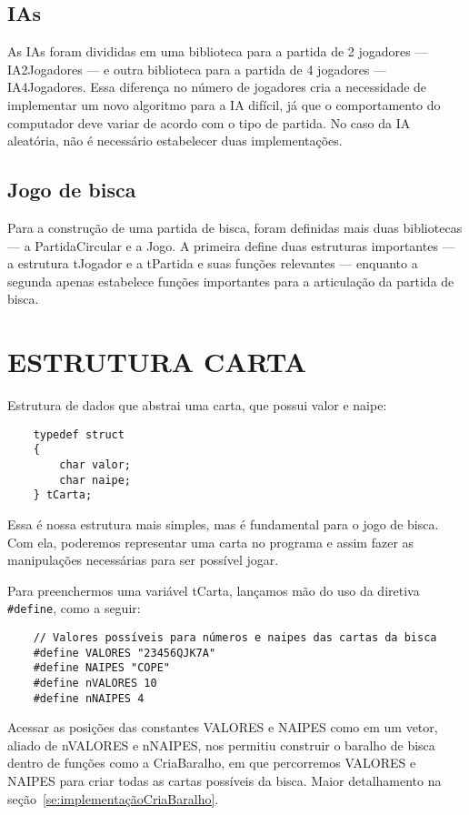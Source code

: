 \documentclass[12pt, oneside, a4paper, brazil]{abntex2}
\begin{document}
\subsection{IAs}
As IAs foram divididas em uma biblioteca para a partida de 2 jogadores --- IA2Jogadores --- e outra biblioteca para a partida de 4 jogadores --- IA4Jogadores. Essa diferença no número de jogadores cria a necessidade de implementar um novo algoritmo para a IA difícil, já que o comportamento do computador deve variar de acordo com o tipo de partida. No caso da IA aleatória, não é necessário estabelecer duas implementações.

\subsection{Jogo de bisca}
Para a construção de uma partida de bisca, foram definidas mais duas bibliotecas --- a PartidaCircular e a Jogo. A primeira define duas estruturas importantes --- a estrutura tJogador e a tPartida e suas funções relevantes ---  enquanto a segunda apenas estabelece funções importantes para a articulação da partida de bisca.

\section{ESTRUTURA CARTA}\label{tadCarta}

Estrutura de dados que abstrai uma carta, que possui valor e naipe:
\begin{lstlisting}
    typedef struct
    {
        char valor;
        char naipe;
    } tCarta;
\end{lstlisting}

Essa é nossa estrutura mais simples, mas é fundamental para o jogo de bisca. Com ela, poderemos representar uma carta no programa e assim fazer as manipulações necessárias para ser possível jogar.

Para preenchermos uma variável tCarta, lançamos mão do uso da diretiva \texttt{\#define}, como a seguir:
\begin{lstlisting}
    // Valores possíveis para números e naipes das cartas da bisca
    #define VALORES "23456QJK7A"
    #define NAIPES "COPE"
    #define nVALORES 10
    #define nNAIPES 4
\end{lstlisting}


Acessar as posições das constantes VALORES e NAIPES como em um vetor, aliado de nVALORES e nNAIPES, nos permitiu construir o baralho de bisca dentro de funções como a CriaBaralho, em que percorremos VALORES e NAIPES para criar todas as cartas possíveis da bisca. Maior detalhamento na seção~\ref{se:implementaçãoCriaBaralho}.
\end{document}
